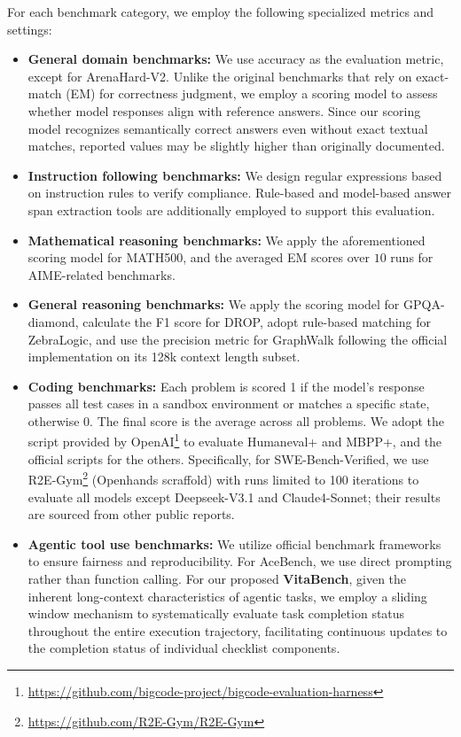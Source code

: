 For each benchmark category, we employ the following specialized metrics and settings:
\begin{itemize}
    \item \textbf{General domain benchmarks:} We use accuracy as the evaluation metric, except for ArenaHard-V2. Unlike the original benchmarks that rely on exact-match (EM) for correctness judgment, we employ a scoring model to assess whether model responses align with reference answers. Since our scoring model recognizes semantically correct answers even without exact textual matches, reported values may be slightly higher than originally documented.
    \item \textbf{Instruction following benchmarks:} We design regular expressions based on instruction rules to verify compliance. Rule-based and model-based answer span extraction tools are additionally employed to support this evaluation.
    \item \textbf{Mathematical reasoning benchmarks:} We apply the aforementioned scoring model for MATH500, and the averaged EM scores over $10$ runs for AIME-related benchmarks.
    \item \textbf{General reasoning benchmarks:}  We apply the scoring model for GPQA-diamond, calculate the F1 score for DROP, adopt rule-based matching for ZebraLogic, and use the precision metric for GraphWalk following the official implementation on its 128k context length subset.
    \item \textbf{Coding benchmarks:} Each problem is scored 1 if the model's response passes all test cases in a sandbox environment or matches a specific state, otherwise 0. The final score is the average across all problems. We adopt the script provided by OpenAI\footnote{\url{https://github.com/bigcode-project/bigcode-evaluation-harness}} to evaluate Humaneval+ and MBPP+, and the official scripts for the others. Specifically, for SWE-Bench-Verified, we use R2E-Gym\footnote{\url{https://github.com/R2E-Gym/R2E-Gym}} (Openhands scraffold) with runs limited to 100 iterations to evaluate all models except Deepseek-V3.1 and Claude4-Sonnet; their results are sourced from other public reports.
    \item \textbf{Agentic tool use benchmarks:} We utilize official benchmark frameworks to ensure fairness and reproducibility. For AceBench, we use direct prompting rather than function calling. For our proposed \textbf{VitaBench}, given the inherent long-context characteristics of agentic tasks, we employ a sliding window mechanism to systematically evaluate task completion status throughout the entire execution trajectory, facilitating continuous updates to the completion status of individual checklist components.
\end{itemize}


